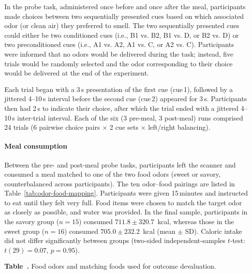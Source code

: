 \documentclass[12pt,letterpaper]{article}
\begin{document}
In the probe task, administered once before and once after the meal, participants made choices between two sequentially presented cues based on which associated odor (or clean air) they preferred to smell. The two sequentially presented cues could either be two conditioned cues (i.e., B1 vs. B2, B1 vs. D, or B2 vs. D) or two preconditioned cues (i.e., A1 vs. A2, A1 vs. C, or A2 vs. C). Participants were informed that no odors would be delivered during the task; instead, five trials would be randomly selected and the odor corresponding to their choice would be delivered at the end of the experiment.

Each trial began with a 3\,s presentation of the first cue (cue\,1), followed by a jittered 4--10\,s interval before the second cue (cue\,2) appeared for 3\,s. Participants then had 2\,s to indicate their choice, after which the trial ended with a jittered 4--10\,s inter-trial interval. Each of the six (3 pre-meal, 3 post-meal) runs comprised 24 trials (6 pairwise choice pairs $\times$ 2 cue sets $\times$ left/right balancing).

\paragraph*{Meal consumption}

Between the pre- and post-meal probe tasks, participants left the scanner and consumed a meal matched to one of the two food odors (sweet or savory, counterbalanced across participants). The ten odor--food pairings are listed in Table~\ref{tab:odor-food-mapping}. Participants were given 15\,minutes and instructed to eat until they felt very full. Food items were chosen to match the target odor as closely as possible, and water was provided. In the final sample, participants in the savory group ($n = 15$) consumed $711.8 \pm 320.7$~kcal, whereas those in the sweet group ($n = 16$) consumed $705.0 \pm 232.2$~kcal (mean $\pm$ SD). Caloric intake did not differ significantly between groups (two-sided independent-samples $t$-test: $t(29) = 0.07$, $p = 0.95$).



\par\bigskip\begingroup
{}


\par\noindent\textbf{Table~\thetable. }Food odors and matching foods used for outcome devaluation.\par
\end{document}
